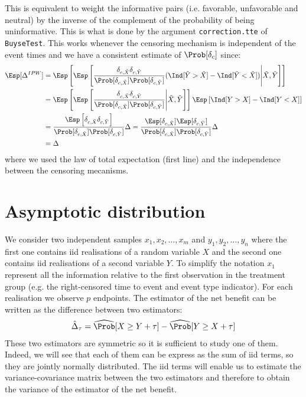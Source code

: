 \documentclass[12pt]{article}
\begin{document}
This is equivalent to weight the informative pairs (i.e. favorable,
unfavorable and neutral) by the inverse of the complement of the
probability of being uninformative. This is what is done by the
argument \texttt{correction.tte} of \texttt{BuyseTest}. This works whenever the
censoring mechanism is independent of the event times and we have a
consistent estimate of \(\Prob[\delta_c]\) since:
\begin{align*}
\Esp[\Delta^{IPW}] &= \Esp\left[ \Esp\left[ \frac{\delta_{c,\tilde{X}}\delta_{c,\tilde{Y}}}{\Prob[\delta_{c,\tilde{X}}]\Prob[\delta_{c,\tilde{Y}}]} (\Ind[\tilde{Y}>\tilde{X}]-\Ind[\tilde{Y}<\tilde{X}]) \Bigg| \tilde{X}, \tilde{Y} \right] \right]\\
&= \Esp\left[\Esp\left[\frac{\delta_{c,\tilde{X}}\delta_{c,\tilde{Y}}}{\Prob[\delta_{c,\tilde{X}}]\Prob[\delta_{c,\tilde{Y}}]} \Bigg| \tilde{X}, \tilde{Y} \right]\right] \Esp\left[\Ind[Y>X]-\Ind[Y<X]\right]\\
&= \frac{\Esp\left[\delta_{c,\tilde{X}}\delta_{c,\tilde{Y}} \right]}{\Prob[\delta_{c,\tilde{X}}]\Prob[\delta_{c,\tilde{Y}}]} \Delta
= \frac{\Esp[\delta_{c,\tilde{X}}]\Esp[\delta_{c,\tilde{Y}}]}{\Prob[\delta_{c,\tilde{X}}]\Prob[\delta_{c,\tilde{Y}}]} \Delta\\
&= \Delta
\end{align*}
where we used the law of total expectation (first line) and the independence between the censoring mecanisms.

\clearpage

\section{Asymptotic distribution}
\label{sec:orge35da5b}

We consider two independent samples \(x_1,x_2,\ldots,x_m\) and
\(y_1,y_2,\ldots,y_n\) where the first one contains iid realisations
of a random variable \(X\) and the second one contains iid
realisations of a second variable \(Y\). To simplify the notation
\(x_1\) represent all the information relative to the first
observation in the treatment group (e.g. the right-censored time to
event and event type indicator). For each realisation we observe \(p\)
endpoints. The estimator of the net benefit can be written as the
difference between two estimators:
\begin{align*}
\hat{\Delta}_\tau = \widehat{\Prob}[X \geq Y+\tau] - \widehat{\Prob}[Y \geq X+\tau]
\end{align*}
These two estimators are symmetric so it is sufficient to study one of
them. Indeed, we will see that each of them can be express as the sum
of iid terms, so they are jointly normally distributed. The iid terms
will enable us to estimate the variance-covariance matrix between the
two estimators and therefore to obtain the variance of the estimator
of the net benefit.
\end{document}
